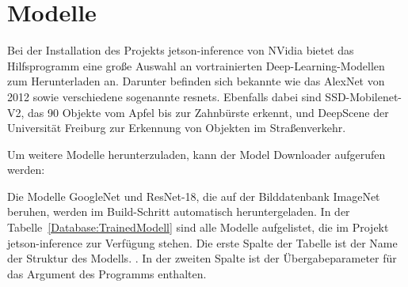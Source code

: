 {


\section{Modelle}

Bei der Installation des Projekts jetson-inference von NVidia bietet das Hilfsprogramm eine große Auswahl an vortrainierten Deep-Learning-Modellen zum Herunterladen an. Darunter befinden sich bekannte wie das AlexNet von 2012 sowie verschiedene sogenannte \ac{resnets}. Ebenfalls dabei sind SSD-Mobilenet-V2, das 90 Objekte vom Apfel bis zur  Zahnbürste erkennt, und DeepScene der Universität Freiburg zur Erkennung von Objekten im Straßenverkehr. 

Um weitere Modelle herunterzuladen, kann der Model Downloader aufgerufen werden:

\medskip

 \newline 
{} 

\medskip

Die Modelle GoogleNet und ResNet-18, die auf der Bilddatenbank ImageNet beruhen, werden im Build-Schritt automatisch heruntergeladen. In der Tabelle~\ref{Database:TrainedModell} sind alle Modelle aufgelistet, die im Projekt jetson-inference zur Verfügung stehen. Die erste Spalte der Tabelle ist der Name der Struktur des Modells. \cite{Alom:2018}. In der zweiten Spalte ist der Übergabeparameter für das Argument  des Programms  enthalten.

\medskip

}
